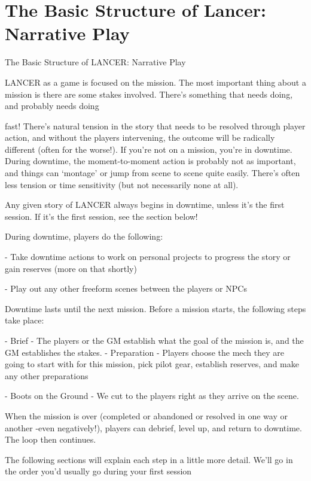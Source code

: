\part{The Basic Structure of Lancer: Narrative Play}

          The Basic Structure of LANCER:
                               Narrative Play

 LANCER as a game is focused on the mission. The most important thing about a mission is
there are some stakes involved. There’s something that needs doing, and probably needs doing




fast! There’s natural tension in the story that needs to be resolved through player action, and
without the players intervening, the outcome will be radically different (often for the worse!). If
you’re not on a mission, you’re in downtime. During downtime, the moment-to-moment action is
probably not as important, and things can ‘montage’ or jump from scene to scene quite easily.
There’s often less tension or time sensitivity (but not necessarily none at all).

Any given story of LANCER always begins in downtime, unless it’s the first session. If it’s the first
session, see the section below!


During downtime, players do the following:

     -   Take downtime actions to work on personal projects to progress the story or gain
         reserves (more on that shortly)

     -   Play out any other freeform scenes between the players or NPCs


Downtime lasts until the next mission. Before a mission starts, the following steps take place:

         	- Brief - The players or the GM establish what the goal of the mission is, and the GM
         establishes the stakes.
         - Preparation - Players choose the mech they are going to start with for this mission,
         pick pilot gear, establish reserves, and make any other preparations

         	- Boots on the Ground - We cut to the players right as they arrive on the scene.


When the mission is over (completed or abandoned or resolved in one way or another -even
negatively!), players can debrief, level up, and return to downtime. The loop then continues.


The following sections will explain each step in a little more detail. We’ll go in the order you’d
usually go during your first session



